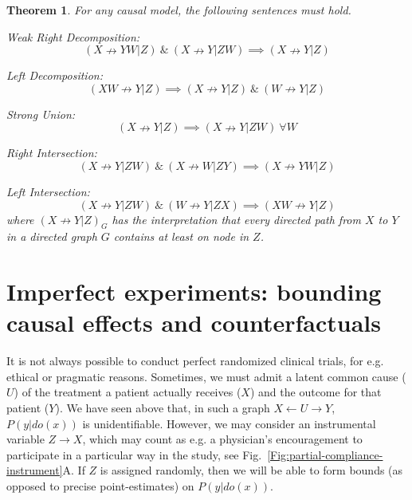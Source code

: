\documentclass[11pt]{article}
\numberwithin{equation}{section}
\newtheorem{thm}{Theorem}[section]
\begin{document}
\begin{thm}
For any causal model, the following sentences must hold.

Weak Right Decomposition:
\begin{equation}
(X \nrightarrow YW|Z)\ \&\ (X \nrightarrow Y| ZW) \implies (X \nrightarrow Y|Z)
\end{equation}

Left Decomposition:
\begin{equation}
(XW \nrightarrow Y| Z) \implies (X \nrightarrow Y | Z)\ \&\ (W \nrightarrow Y | Z)
\end{equation}

Strong Union:
\begin{equation}
(X \nrightarrow Y | Z) \implies (X \nrightarrow Y|ZW)\ \forall W
\end{equation} 

Right Intersection:
\begin{equation}
(X \nrightarrow Y|ZW)\ \&\ (X \nrightarrow W| ZY) \implies (X \nrightarrow YW|Z)
\end{equation}

Left Intersection:
\begin{equation}
(X \nrightarrow Y| ZW)\ \&\ (W \nrightarrow Y | ZX) \implies (XW \nrightarrow Y| Z)
\end{equation}
where $(X \nrightarrow Y| Z)_G$ has the interpretation that every directed path from $X$ to $Y$ in a directed graph $G$ contains at least on node in $Z$.
\end{thm}

\section{Imperfect experiments: bounding causal effects and counterfactuals}
It is not always possible to conduct perfect randomized clinical trials, for e.g. ethical or pragmatic reasons. Sometimes, we must admit a latent common cause ($U$) of the treatment a patient actually receives ($X$) and the outcome for that patient ($Y$). We have seen above that, in such a graph $X \leftarrow U \rightarrow Y$, $P(y|do(x))$ is unidentifiable. However, we may consider an instrumental variable $Z \rightarrow X$, which may count as e.g. a physician's encouragement to participate in a particular way in the study, see Fig.~\ref{Fig:partial-compliance-instrument}A. If $Z$ is assigned randomly, then we will be able to form bounds (as opposed to precise point-estimates) on $P(y|do(x))$.
\end{document}
